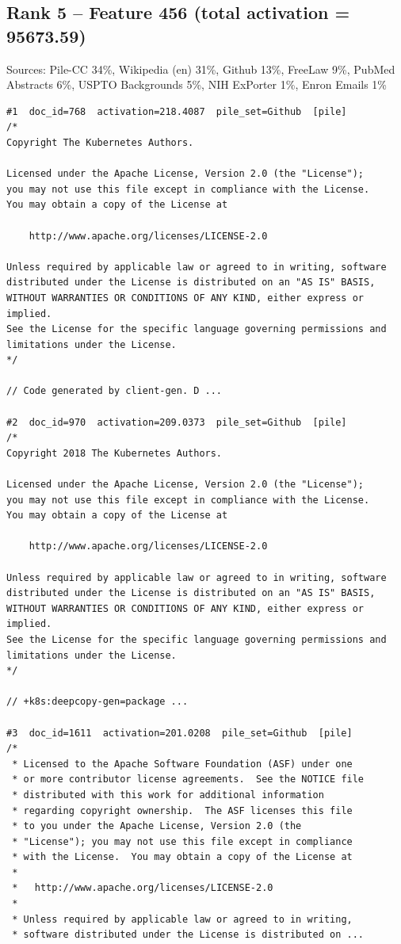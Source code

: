 \subsection*{Rank 5 -- Feature 456 (total activation = 95673.59)}

Sources: Pile-CC 34\%, Wikipedia (en) 31\%, Github 13\%, FreeLaw 9\%, PubMed Abstracts 6\%, USPTO Backgrounds 5\%, NIH ExPorter 1\%, Enron Emails 1\%

\begin{verbatim}
#1  doc_id=768  activation=218.4087  pile_set=Github  [pile]
/*
Copyright The Kubernetes Authors.

Licensed under the Apache License, Version 2.0 (the "License");
you may not use this file except in compliance with the License.
You may obtain a copy of the License at

    http://www.apache.org/licenses/LICENSE-2.0

Unless required by applicable law or agreed to in writing, software
distributed under the License is distributed on an "AS IS" BASIS,
WITHOUT WARRANTIES OR CONDITIONS OF ANY KIND, either express or implied.
See the License for the specific language governing permissions and
limitations under the License.
*/

// Code generated by client-gen. D ...

#2  doc_id=970  activation=209.0373  pile_set=Github  [pile]
/*
Copyright 2018 The Kubernetes Authors.

Licensed under the Apache License, Version 2.0 (the "License");
you may not use this file except in compliance with the License.
You may obtain a copy of the License at

    http://www.apache.org/licenses/LICENSE-2.0

Unless required by applicable law or agreed to in writing, software
distributed under the License is distributed on an "AS IS" BASIS,
WITHOUT WARRANTIES OR CONDITIONS OF ANY KIND, either express or implied.
See the License for the specific language governing permissions and
limitations under the License.
*/

// +k8s:deepcopy-gen=package ...

#3  doc_id=1611  activation=201.0208  pile_set=Github  [pile]
/*
 * Licensed to the Apache Software Foundation (ASF) under one
 * or more contributor license agreements.  See the NOTICE file
 * distributed with this work for additional information
 * regarding copyright ownership.  The ASF licenses this file
 * to you under the Apache License, Version 2.0 (the
 * "License"); you may not use this file except in compliance
 * with the License.  You may obtain a copy of the License at
 *
 *   http://www.apache.org/licenses/LICENSE-2.0
 *
 * Unless required by applicable law or agreed to in writing,
 * software distributed under the License is distributed on ...


\end{verbatim}
